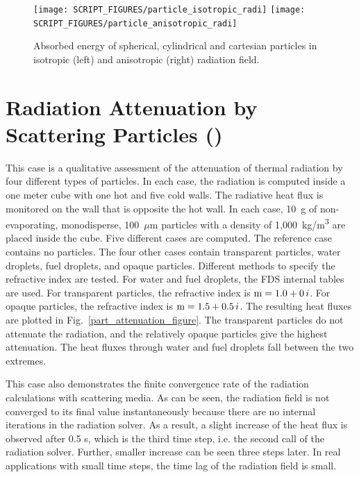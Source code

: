 \documentclass[11pt]{book}
\begin{document}
\begin{figure}[ht]
\texttt{[image: SCRIPT\_FIGURES/particle\_isotropic\_radi]}
\texttt{[image: SCRIPT\_FIGURES/particle\_anisotropic\_radi]}
\caption[The {\ct particle\_isotropic\_radi} and {\ct particle\_anisotropic\_radi} test cases]{Absorbed energy of spherical, cylindrical and cartesian particles in isotropic (left) and anisotropic (right) radiation field.}
\label{particle_an_isotropic_radiation_figs}
\end{figure}


\section{Radiation Attenuation by Scattering Particles (\texorpdfstring{}{part\_attenuation}) }
\label{part_attenuation}

This case is a qualitative assessment of the attenuation of thermal radiation by four different types of particles. In each case, the radiation is computed inside a one meter cube with one hot and five cold walls. The radiative heat flux is monitored on the wall that is opposite the hot wall. In each case, 10~g of non-evaporating, monodisperse, 100~$\mu$m particles with a density of 1,000~\si{kg/m^3} are placed inside the cube. Five different cases are computed. The reference case contains no particles. The four other cases contain transparent particles, water droplets, fuel droplets, and opaque particles. Different methods to specify the refractive index are tested. For water and fuel droplets, the FDS internal tables are used. For transparent particles, the refractive index is $\hbox{m} = 1.0+0\,i$. For opaque particles, the refractive index is $\hbox{m} = 1.5+0.5 \,i$. The resulting heat fluxes are plotted in Fig.~\ref{part_attenuation_figure}. The transparent particles do not attenuate the radiation, and the relatively opaque particles give the highest attenuation. The heat fluxes through water and fuel droplets fall between the two extremes.

This case also demonstrates the finite convergence rate of the radiation calculations with scattering media. As can be seen, the radiation field is not converged to its final value instantaneously because there are no internal iterations in the radiation solver. As a result, a slight increase of the heat flux is observed after 0.5 s, which is the third time step, i.e. the second call of the radiation solver. Further, smaller increase can be seen three steps later. In real applications with small time steps, the time lag of the radiation field is small.
\end{document}
